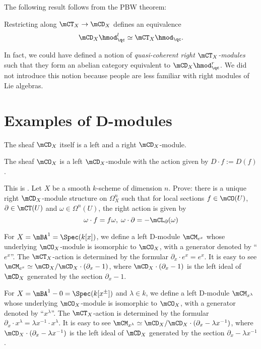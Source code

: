 	The following result follows from the PBW theorem:

	\begin{prop}
		Restricting along $\mCT_X \to \mCD_X$ defines an equivalence
		\[
			\mCD_X\hmod^l_\qc \simeq \mCT_X\hmod_\qc.
		\]
	\end{prop}

	\begin{rem}
		In fact, we could have defined a notion of \emph{quasi-coherent right $\mCT_X$-modules} such that they form an abelian category equivalent to $\mCD_X\hmod^r_\qc$. We did not introduce this notion because people are less familiar with right modules of Lie algebras.
	\end{rem}

\section{Examples of D-modules}

	\begin{exam}
		The sheaf $\mCD_X$ itself is a left and a right $\mCD_X$-module.
	\end{exam}

	\begin{exam}
		The sheaf $\mCO_X$ is a left $\mCD_X$-module with the action given by $D\cdot f:=D(f)$.
	\end{exam}

	\begin{exe}
		This is . Let $X$ be a smooth $k$-scheme of dimension $n$. Prove: there is a unique right $\mCD_X$-module structure on $\Omega_X^n$ such that for local sections $f\in \mCO(U)$, $\partial\in \mCT(U)$ and $\omega\in \Omega^n(U)$, the right action is given by
		\[
			\omega \cdot f = f\omega,\; \omega \cdot \partial = -\mCL_\partial(\omega)
		\]
	\end{exe}

	\begin{exam}
		For $X=\mBA^1=\Spec (k[x])$, we define a left D-module $\mCM_{e^x}$ whose underlying $\mCO_X$-module is isomorphic to $\mCO_X$, with a generator denoted by ``$e^x$''. The $\mCT_X$-action is determined by the formular $\partial_x \cdot e^x = e^x$. It is easy to see $\mCM_{e^x} \simeq \mCD_X/\mCD_X\cdot(\partial_x-1)$, where $\mCD_X\cdot(\partial_x-1)$ is the left ideal of $\mCD_X$ generated by the section $\partial_x-1$.
	\end{exam}

	\begin{exam}
		\label{exam-monodromy}
		For $X=\mBA^1-0=\Spec (k[x^\pm])$ and $\lambda\in k$, we define a left D-module $\mCM_{x^\lambda}$ whose underlying $\mCO_X$-module is isomorphic to $\mCO_X$, with a generator denoted by ``$x^\lambda$''. The $\mCT_X$-action is determined by the formular $\partial_x \cdot x^\lambda = \lambda x^{-1}\cdot x^{\lambda}$. It is easy to see $\mCM_{x^\lambda} \simeq \mCD_X/\mCD_X\cdot(\partial_x-\lambda x^{-1})$, where $\mCD_X\cdot(\partial_x-\lambda x^{-1})$ is the left ideal of $\mCD_X$ generated by the section $\partial_x-\lambda x^{-1}$.
	\end{exam}

